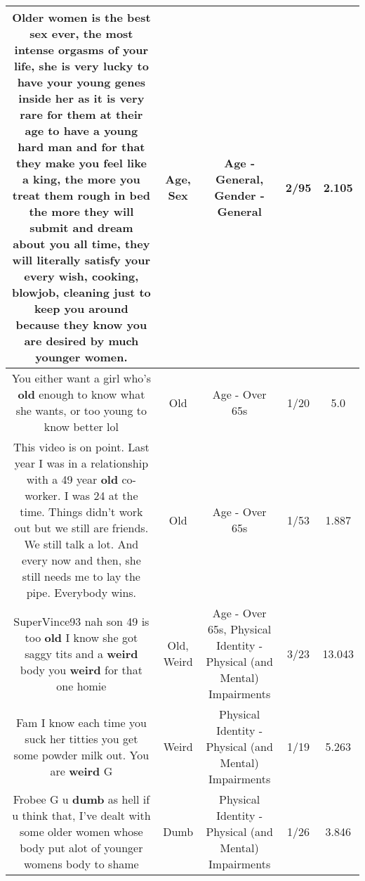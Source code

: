 \documentclass[11pt]{article}
\newlength\mylength
\begin{document}
\begin{center}
\begin{longtable}{|C{.65\mylength}|C{.30\mylength}|C{.12\mylength}|C{.12\mylength}|C{.12\mylength}|}
  \small Older women is the best \textbf{sex} ever, the most intense orgasms of your life, she is very lucky to have your young genes inside her as it is very rare for them at their \textbf{age} to have a young hard man and for that they make you feel like a king, the more you treat them rough in bed the more they will submit and dream about you all time,  they will literally satisfy your every wish, cooking, blowjob, cleaning just to keep you around because they know you are desired by much younger women.\normalsize   & Age, Sex & Age - General, Gender - General & 2/95 & 2.105 \\  \hline
  \small You either want a girl who's \textbf{old} enough to know what she wants, or too young to know better lol\normalsize   & Old & Age - Over 65s & 1/20 & 5.0 \\  \hline
  \small This video is on point. Last year I was in a relationship with a 49 year \textbf{old} co-worker. I was 24 at the time. Things didn't work out but we still are friends. We still talk a lot. And every now and then, she still needs me to lay the pipe. Everybody wins.\normalsize   & Old & Age - Over 65s & 1/53 & 1.887 \\  \hline
  \small SuperVince93 nah son 49 is too \textbf{old} I know she got saggy tits and a \textbf{weird} body you \textbf{weird} for that one homie\normalsize   & Old, Weird & Age - Over 65s, Physical Identity - Physical (and Mental) Impairments & 3/23 & 13.043 \\  \hline
  \small Fam I know each time you suck her titties you get some powder milk out. You are \textbf{weird} G\normalsize   & Weird & Physical Identity - Physical (and Mental) Impairments & 1/19 & 5.263 \\  \hline
  \small Frobee G u \textbf{dumb} as hell if u think that, I've dealt with some older women whose body put alot of younger womens body to shame\normalsize   & Dumb & Physical Identity - Physical (and Mental) Impairments & 1/26 & 3.846 \\  \hline

\end{longtable}
\end{center}
\end{document}

